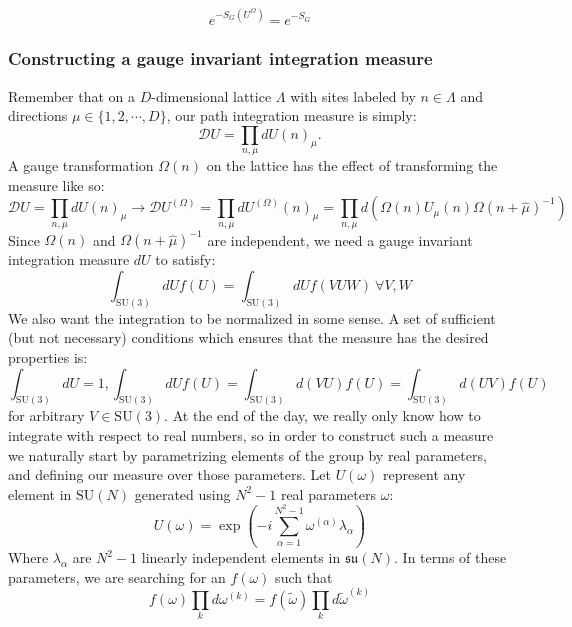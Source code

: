 \documentclass[11pt]{article}
\begin{document}
\begin{equation}e^{-S_G(U^{\Omega})}=e^{-S_G}\end{equation}

\subsubsection{Constructing a gauge invariant integration measure}
Remember that on a $D$-dimensional lattice $\Lambda$ with sites labeled by $n\in\Lambda$ and directions $\mu\in\{1,2,\cdots,D\}$, our path integration measure is simply:
\begin{equation}\mathcal DU=\prod_{n,\mu} dU(n)_\mu.\end{equation}
A gauge transformation $\Omega(n)$ on the lattice has the effect of transforming the measure like so:
\begin{equation}\mathcal DU=\prod_{n,\mu} dU(n)_\mu\to \mathcal DU^{(\Omega)}=\prod_{n,\mu} dU^{(\Omega)}(n)_\mu=\prod_{n,\mu}d\left(\Omega(n)U_\mu(n)\Omega(n+\hat\mu)^{-1}\right)\end{equation}
Since $\Omega(n)$ and $\Omega(n+\hat\mu)^{-1}$ are independent, we need a gauge invariant integration measure $dU$ to satisfy:
\begin{equation}\int_{\mathrm{SU(3)}}dU f(U)=\int_{\mathrm{SU(3)}}dU f(VUW)\ \forall V,W\end{equation}
We also want the integration to be normalized in some sense. A set of sufficient (but not necessary) conditions which ensures that the measure has the desired properties is:
\begin{equation}\int_{\mathrm{SU}(3)} dU=1, \int_{\mathrm{SU}(3)} dU f(U)=\int_{\mathrm{SU}(3)} d(VU) f(U)=\int_{\mathrm{SU}(3)} d(UV) f(U)\end{equation}
for arbitrary $V\in\mathrm{SU}(3)$. At the end of the day, we really only know how to integrate with respect to real numbers, so in order to construct such a measure we naturally start by parametrizing elements of the group by real parameters, and defining our measure over those parameters. Let $U(\omega)$ represent any element in $\mathrm{SU}(N)$ generated using $N^2-1$ real parameters $\omega$:
\begin{equation}U(\omega)=\exp\left(-i\sum_{\alpha=1}^{N^2-1}\omega^{(\alpha)}\lambda_\alpha\right)\end{equation}
Where $\lambda_\alpha$ are $N^2-1$ linearly independent elements in $\mathfrak{su}(N)$. In terms of these parameters, we are searching for an $f(\omega)$ such that
\begin{equation}f(\omega)\prod_k d\omega^{(k)}=f(\tilde\omega)\prod_k d\tilde\omega^{(k)}\end{equation}
\end{document}

